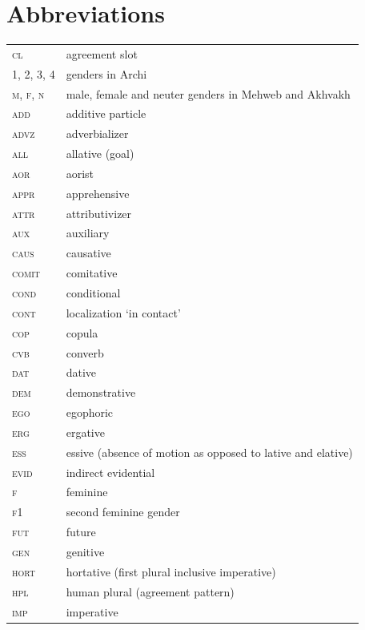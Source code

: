 \documentclass[output=paper,colorlinks,citecolor=brown]{langscibook}
\begin{document}
\section*{Abbreviations}
\begin{tabularx}{.5\textwidth}{@{}lQ@{}}
\textsc{cl} & agreement slot \\
\textsc{1, 2, 3, 4} & genders in Archi \\
\textsc{m, f, n} & male, female and neuter genders in Mehweb and Akhvakh \\
\textsc{add} & additive particle \\
\textsc{advz} & adverbializer \\
\textsc{all} & allative (goal) \\
\textsc{aor} & aorist \\
\textsc{appr} & apprehensive \\
\textsc{attr} & attributivizer \\
\textsc{aux} & auxiliary \\
\textsc{caus} & causative \\
\textsc{comit} & comitative \\
\textsc{cond} & conditional \\
\textsc{cont} & localization `in contact' \\
\textsc{cop} & copula \\
\textsc{cvb} & converb \\
\textsc{dat} & dative \\
\textsc{dem} & demonstrative \\
\textsc{ego} & egophoric \\
\textsc{erg} & ergative \\
\textsc{ess} & essive (absence of motion as opposed to lative and elative)\\
\textsc{evid} & indirect evidential \\
\textsc{f} & feminine \\
\textsc{f1} & second feminine gender \\
\textsc{fut} & future \\
\textsc{gen} & genitive \\
\textsc{hort} & hortative (first plural inclusive imperative) \\
\textsc{hpl} & human plural (agreement pattern) \\
\textsc{imp} & imperative\end{tabularx}
\end{document}
